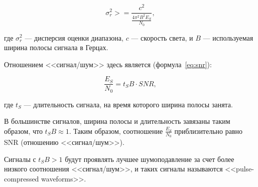 \begin{equation}
    \label{eq:crb}
    \sigma_r^2 >= \frac{c^2}{\frac{4 \pi^2 B^2 E_S}{N_0}},
\end{equation}

где $\sigma_r^2$ --- дисперсия оценки диапазона,
$c$ --- скорость света,
и $B$ --- используемая ширина полосы сигнала в Герцах.

Отношением <<сигнал/шум>> здесь является (формула~\eqref{eq:snr}):

\begin{equation}
    \label{eq:snr}
    \frac{E_S}{N_0} = t_S B \cdot SNR,
\end{equation}

где $t_S$ --- длительность сигнала, на время которого ширина полосы занята.

В большинстве сигналов, ширина полосы и длительность завязаны таким образом, что $t_S B \approx 1$. Таким образом, соотношение $\frac{E_S}{N_0}$ приблизительно равно SNR (отношению <<сигнал/шум>>).

Сигналы с $t_S B > 1$ будут проявлять лучшее шумоподавление за счет более низкого соотношения <<сигнал/шум>>, и таких сигналы называются <<pulse-compressed waveforms>>.




